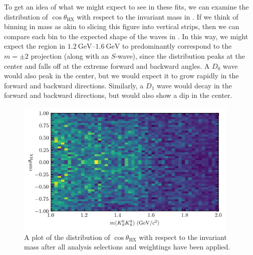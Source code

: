 To get an idea of what we might expect to see in these fits, we can examine the distribution of $\cos\theta_\text{HX}$ with respect to the invariant mass in . If we think of binning in mass as akin to slicing this figure into vertical strips, then we can compare each bin to the expected shape of the waves in . In this way, we might expect the region in $\qtyrange{1.2}{1.6}{\giga\electronvolt}$ to predominantly correspond to the $m=\pm 2$ projection (along with an $S$-wave), since the distribution peaks at the center and falls off at the extreme forward and backward angles. A $D_0$ wave would also peak in the center, but we would expect it to grow rapidly in the forward and backward directions. Similarly, a $D_1$ wave would decay in the forward and backward directions, but would also show a dip in the center.

\begin{figure}
  \begin{center}
    \includegraphics[width=0.95\textwidth]{figures/costheta_data_accpol_chisqdof_3.4_splot_D_1s_2b.png}
  \end{center}
  \caption{A plot of the distribution of $\cos\theta_\text{HX}$ with respect to the invariant mass after all analysis selections and weightings have been applied.}\label{fig:costheta-vs-mass}
\end{figure}

